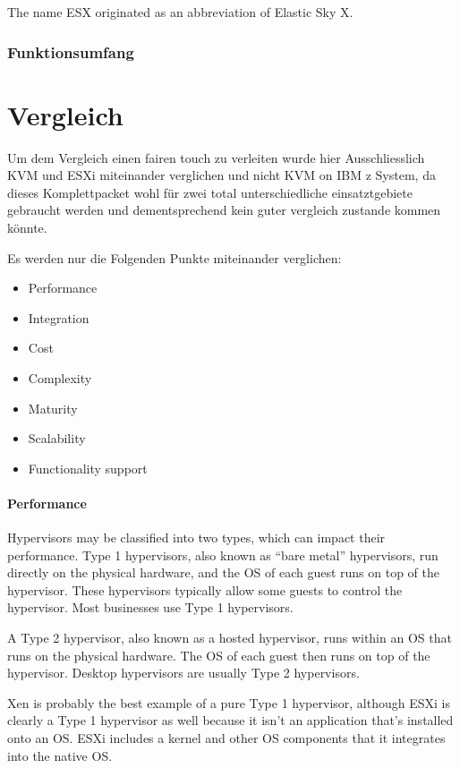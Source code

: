 \documentclass[14pt]{extreport}
\begin{document}
The name ESX originated as an abbreviation of Elastic Sky X.

\subsection{Funktionsumfang}


\chapter{Vergleich}
Um dem Vergleich einen fairen touch zu verleiten wurde hier Ausschliesslich KVM und ESXi miteinander verglichen und nicht KVM on IBM z System, da dieses Komplettpacket wohl für zwei total unterschiedliche einsatztgebiete gebraucht werden und dementsprechend kein guter vergleich zustande kommen könnte.

Es werden nur die Folgenden Punkte miteinander verglichen:
\begin{itemize}
	\item	Performance
	\item	Integration
	\item	Cost
	\item	Complexity
	\item	Maturity
	\item	Scalability
	\item	Functionality support
\end{itemize}


\subsubsection{Performance}

Hypervisors may be classified into two types, which can impact their performance. Type 1 hypervisors, also known as “bare metal” hypervisors, run directly on the physical hardware, and the OS of each guest runs on top of the hypervisor. These hypervisors typically allow some guests to control the hypervisor. Most businesses use Type 1 hypervisors.

A Type 2 hypervisor, also known as a hosted hypervisor, runs within an OS that runs on the physical hardware. The OS of each guest then runs on top of the hypervisor. Desktop hypervisors are usually Type 2 hypervisors.

Xen is probably the best example of a pure Type 1 hypervisor, although ESXi is clearly a Type 1 hypervisor as well because it isn’t an application that’s installed onto an OS. ESXi includes a kernel and other OS components that it integrates into the native OS.
\end{document}
